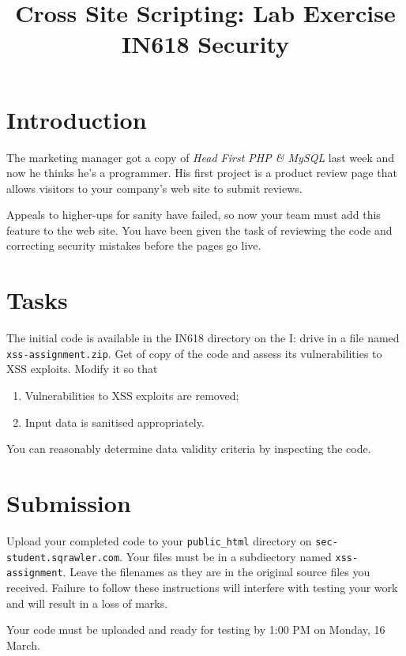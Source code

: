 \documentclass{article}
\begin{document}
\title{Cross Site Scripting: Lab Exercise\\ IN618 Security}
\date{}
\maketitle

\section*{Introduction}
The marketing manager got a copy of \emph{Head First PHP \& MySQL} last week
and now he thinks he's a programmer.  His first project is a product review
page that allows visitors to your company's web site to submit reviews.

Appeals to higher-ups for sanity have failed, so now your team must
add this feature to the web site.  You have been given the task of 
reviewing the code and correcting security mistakes before the pages
go live.

\section{Tasks}
The initial code is available in the IN618 directory on the I: drive in a file 
named \texttt{xss-assignment.zip}. Get of copy of the code and assess its
vulnerabilities to XSS exploits.  Modify it so that

\begin{enumerate}
	\item Vulnerabilities to XSS exploits are removed;
	\item Input data is sanitised appropriately.
\end{enumerate}

You can reasonably determine data validity criteria by inspecting the code.

\section{Submission}
Upload your completed code to your \texttt{public\_html} directory on 
\texttt{sec-student.sqrawler.com}.  Your files must be in a subdiectory
named \texttt{xss-assignment}. Leave the filenames as they are in the 
original source files you received.  Failure to follow these instructions
will interfere with testing your work and will result in a loss of marks.

Your code must be uploaded and ready for testing by 1:00 PM on Monday,
16 March.
\end{document}
